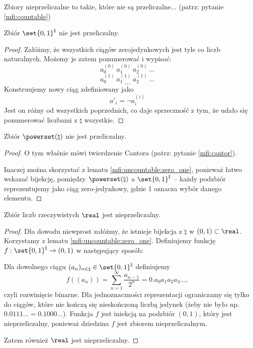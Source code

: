 Zbiory nieprzeliczalne to takie, które nie są przeliczalne... (patrz: pytanie \ref{mfi:countable})

\begin{lemma}\label{mfi:uncountable:zero_one}
    Zbiór \( \set{0, 1}^{\natural} \) nie jest przeliczalny.
\end{lemma}
\begin{proof}
    Załóżmy, że wszystkich ciągów zerojedynkowych jest tyle co liczb naturalnych. Możemy je zatem ponumerować i wypisać:
    \[
        a_0^{(0)} \ a_1^{(0)} \ a_2^{(0)} \ \dots
    \]
    \[
        a_0^{(1)} \ a_1^{(1)} \ a_2^{(1)} \ \dots
    \]
    \[
        \dots
    \]
    Konstruujemy nowy ciąg zdefiniowany jako
    \[
        a'_i = \lnot a_i^{(i)}
    \]
    Jest on różny od wszystkich poprzednich, co daje sprzeczność z tym, że udało się ponumerować liczbami z \( \natural \) wszystkie.
\end{proof}

\begin{lemma}
    Zbiór \( \powerset(\natural) \) nie jest przeliczalny.
\end{lemma}
\begin{proof}
    O tym właśnie mówi twierdzenie Cantora (patrz: pytanie \ref{mfi:cantor}).

    Inaczej można skorzystać z lematu \ref{mfi:uncountable:zero_one}, ponieważ łatwo wskazać bijekcję, pomiędzy \( \powerset(\natural) \) a \( \set{0, 1}^{\natural} \)
    -- każdy podzbiór reprezentujemy jako ciąg zero-jedynkowy, gdzie 1 oznacza wybór danego elementu.
\end{proof}

\begin{theorem}
    Zbiór liczb rzeczywistych \( \real \) jest nieprzeliczalny.
\end{theorem}
\begin{proof}
    Dla dowodu niewprost załóżmy, że istnieje bijekcja z \( \natural \) w \( (0,1) \subset \real \). Korzystamy z lematu \ref{mfi:uncountable:zero_one}. 
    Definiujemy funkcję \( f: \set{0, 1}^{\natural} \rightarrow (0, 1) \) w następujący sposób:

    Dla dowolnego ciągu \( (a_n)_{n \in \natural} \in \set{0, 1}^\natural \) definiujemy
    \[
        f((a_n)) = \sum_{n = 1}^{\infty} \frac{a_{n-1}}{2^n} = 0.a_0 a_1 a_2 a_3 \ldots,
    \]
    czyli rozwinięcie binarne. Dla jednoznaczności reprezentacji ograniczamy się tylko do ciągów, które nie kończą się nieskończoną liczbą jedynek (żeby nie było np. \(0.0111\ldots = 0.1000\ldots\)).
    Funkcja \( f \) jest iniekcją na podzbiór \( (0,1) \), który jest nieprzeliczalny, ponieważ dziedzina \( f \) jest zbiorem nieprzeliczalnym.

    Zatem również \( \real \) jest nieprzeliczalny.
\end{proof}